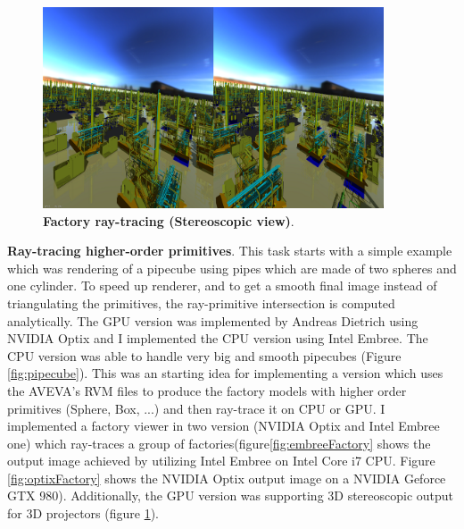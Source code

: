 \documentclass[]{report}
\begin{document}
\begin{figure}[!ht]
	\centering
	\includegraphics[width=0.90\textwidth]{./figs/stereo.png}
	\caption[Factory ray-tracing (Stereoscopic view)]{\textbf{Factory ray-tracing (Stereoscopic view)}.}
	\label{fig:stereoFactory}
\end{figure}

\textbf{Ray-tracing higher-order primitives}. This task starts with a simple example which was rendering of a pipecube using pipes which are made of two spheres and one cylinder. To speed up renderer, and to get a smooth final image instead of triangulating the primitives, the ray-primitive intersection is computed analytically. The GPU version was implemented by Andreas Dietrich using NVIDIA Optix and I implemented the CPU version using Intel Embree. The CPU version was able to handle very big and smooth pipecubes (Figure \ref{fig:pipecube}). This was an starting idea for implementing a version which uses the AVEVA's RVM files to produce the factory models with higher order primitives (Sphere, Box, ...) and then ray-trace it on CPU or GPU. I implemented a factory viewer in two version (NVIDIA Optix and Intel Embree one) which ray-traces a group of factories(figure\ref{fig:embreeFactory} shows the output image achieved by utilizing Intel Embree on Intel Core i7 CPU. Figure \ref{fig:optixFactory} shows the NVIDIA Optix output image on a NVIDIA Geforce GTX 980). Additionally, the GPU version was supporting 3D stereoscopic output for 3D projectors (figure \ref{fig:stereoFactory}).
\end{document}
